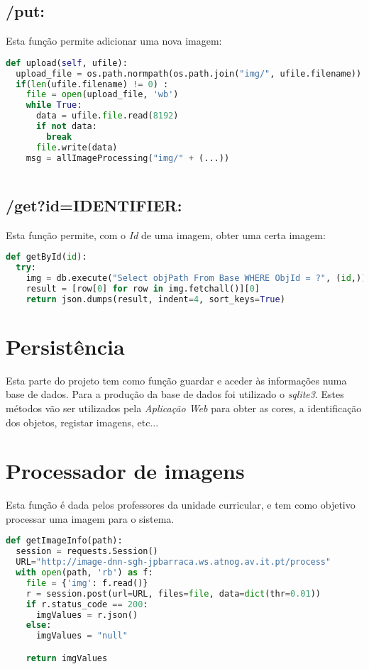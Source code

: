 \documentclass{report}
\begin{document}
\subsection{/put:}
Esta função permite adicionar uma nova imagem:
\begin{lstlisting}[language=Python, caption={addToDatabase}] 
def upload(self, ufile):
  upload_file = os.path.normpath(os.path.join("img/", ufile.filename))
  if(len(ufile.filename) != 0) :
    file = open(upload_file, 'wb')
    while True:
      data = ufile.file.read(8192)
      if not data:
        break
      file.write(data)
    msg = allImageProcessing("img/" + (...))
  
\end{lstlisting}


\subsection{/get?id=IDENTIFIER:}
Esta função permite, com o \textit{Id} de uma imagem, obter uma certa imagem:

\begin{lstlisting}[language=Python, caption={getById}] 
def getById(id): 
  try:
    img = db.execute("Select objPath From Base WHERE ObjId = ?", (id,))
    result = [row[0] for row in img.fetchall()][0]
    return json.dumps(result, indent=4, sort_keys=True)
\end{lstlisting}


\section{Persistência}
Esta parte do projeto tem como função guardar e aceder às informações numa base de dados. Para a produção da base de dados foi utilizado o \textit{sqlite3}. Estes métodos vão ser utilizados pela \textit{Aplicação Web} para obter as cores, a identificação dos objetos, registar imagens, etc...

\section{Processador de imagens}
Esta função é dada pelos professores da unidade curricular, e tem como objetivo processar uma imagem para o sistema.
\begin{lstlisting}[language=Python, caption={getImageInfo}] 
def getImageInfo(path):
  session = requests.Session()
  URL="http://image-dnn-sgh-jpbarraca.ws.atnog.av.it.pt/process"
  with open(path, 'rb') as f:
    file = {'img': f.read()}
    r = session.post(url=URL, files=file, data=dict(thr=0.01))
    if r.status_code == 200:
      imgValues = r.json()
    else:
      imgValues = "null"

    return imgValues
\end{lstlisting}
\end{document}
